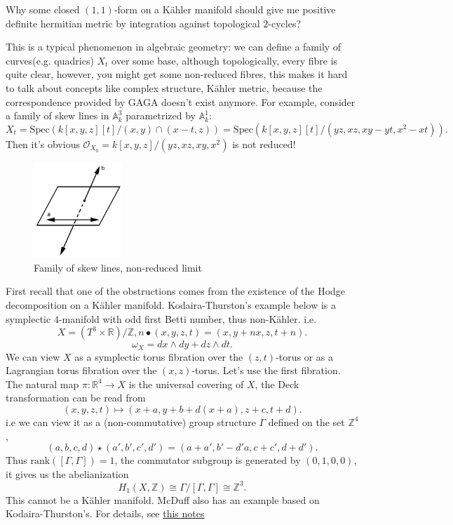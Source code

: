 \documentclass[../main.tex]{subfiles}
\begin{document}
\begin{remark}
Why some closed $(1,1)$-form on a Kähler manifold  should give me positive definite hermitian metric by integration against topological $2$-cycles? 
\end{remark}
\begin{remark}
This is a typical phenomenon in algebraic geometry: we can define a family of curves(e.g. quadrics) $X_{t}$ over some base, although topologically, every fibre is quite clear, however, you might get some non-reduced fibres, this makes it hard to talk about concepts like complex structure, Kähler metric, because the correspondence provided by GAGA doesn't exist anymore. For example, consider a family of skew lines in $\mathbb{A}_{k}^{3}$ parametrized by $\mathbb{A}_{k}^{1}:$
$$X_{t}=\mathrm{Spec}(k[x,y,z][t]/(x,y)\cap (x-t,z))=\mathrm{Spec}(k[x,y,z][t]/(yz,xz,xy-yt,x^{2}-xt)).$$
Then it's obvious $\mathcal{O}_{X_{0}}=k[x,y,z]/(yz,xz,xy,x^{2})$ is not reduced!
\begin{figure}[h!]
\centering
\includegraphics[width=0.3\textwidth]{img/skewlines.jpg}
\caption{Family of skew lines, non-reduced limit}
\label{fig:Family of skew lines, non-reduced limit}
\end{figure}
\end{remark}
\begin{remark}
First recall that one of the obstructions comes from the existence of the Hodge decomposition on a Kähler manifold. Kodaira-Thurston's example below is a symplectic $4$-manifold with odd first Betti number, thus non-Kähler. i.e.
$$X=(T^{3}\times \mathbb{R})/\mathbb{Z}, n\bullet(x,y,z,t)=(x,y+nx, z, t+n).$$
$$\omega_{X}=dx\wedge dy+dz\wedge dt.$$
We can view $X$ as a symplectic torus fibration over the $(z,t)$-torus or as a Lagrangian torus fibration over the $(x,z)$-torus. Let's use the first fibration. The natural map $\pi: \mathbb{R}^{4}\rightarrow X$ is the universal covering of $X$, the Deck transformation can be read from 
$$(x,y,z,t)\mapsto (x+a, y+b+d(x+a), z+c, t+d).$$
i.e we can view it as a (non-commutative) group structure $\Gamma$ defined on the set $\mathbb{Z}^{4}$,
$$(a,b,c,d)\star (a',b',c',d')=(a+a', b'-d'a, c+c', d+d').$$
Thus $\mathrm{rank}([\Gamma, \Gamma])=1$, the commutator subgroup is generated by $(0,1,0,0)$, it gives us the abelianization 
$$H_{1}(X,\mathbb{Z})\cong \Gamma/[\Gamma,\Gamma]\cong \mathbb{Z}^{3}.$$
This cannot be a Kähler manifold. McDuff also has an example based on Kodaira-Thurston's. For details, see 
\href{http://www.homepages.ucl.ac.uk/~ucahjde/ST-lectures/lecture11.pdf}{this notes}
\end{remark}
\end{document}
